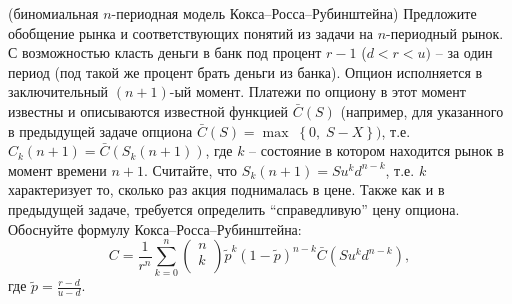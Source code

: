 \begin{problem}(биномиальная $n$-периодная 
модель Кокса--Росса--Рубинштейна)\label{n-period} Предложите обобщение рынка и 
соответствующих понятий из задачи \label{sec:levilong} на $n$-периодный рынок. С возможностью класть 
деньги в банк под процент $r-1$ ($d<r<u)$ -- за один период (под такой же 
процент брать деньги из банка). Опцион исполняется в заключительный $(n+1)$-ый 
момент. Платежи по опциону в этот момент известны и описываются известной 
функцией $\bar {C}\left( S \right)$ (например, для указанного в предыдущей задаче 
опциона $\bar {C}\left( S \right)=\max \;\left\{ {0,\;S-X} \right\})$, 
т.е. $C_k \left( {n+1} \right)=\bar {C}\left( {S_k \left( {n+1} \right)} 
\right)$, где $k$ -- состояние в котором находится рынок в момент времени 
$n+1$. Считайте, что $S_k \left( {n+1} \right)=Su^kd^{n-k}$, т.е. $k$  
характеризует то, сколько раз акция поднималась в цене. Также как и в предыдущей задаче, 
требуется определить ``справедливую'' цену опциона.
Обоснуйте формулу Кокса--Росса--Рубинштейна:
\begin{equation}
\label{koks}
C=\frac{1}{r^n}\sum\limits_{k=0}^n {\left( {\begin{array}{l}
 n \\ 
 k \\ 
 \end{array}} \right)} \tilde {p}^k\left( {1-\tilde {p}} \right)^{n-k}\bar 
{C}\left( {Su^kd^{n-k}} \right),
\end{equation}
где $\tilde {p}=\frac{r-d}{u-d}.$
\end{problem}

